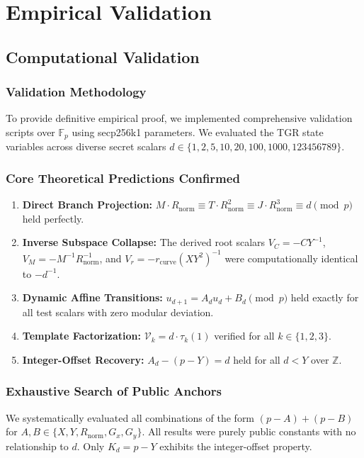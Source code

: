 \documentclass[11pt, a4paper, twoside]{book}
\begin{document}
\part{Empirical Validation}

\chapter{Computational Validation}

\section{Validation Methodology}
To provide definitive empirical proof, we implemented comprehensive validation scripts over $\mathbb{F}_p$ using secp256k1 parameters. We evaluated the TGR state variables across diverse secret scalars $d \in \{1, 2, 5, 10, 20, 100, 1000, 123456789\}$.

\section{Core Theoretical Predictions Confirmed}
\begin{enumerate}
    \item \textbf{Direct Branch Projection:} $M \cdot R_{\text{norm}} \equiv T \cdot R_{\text{norm}}^2 \equiv J \cdot R_{\text{norm}}^3 \equiv d \pmod p$ held perfectly.
    \item \textbf{Inverse Subspace Collapse:} The derived root scalars $V_C = -C Y^{-1}$, $V_M = -M^{-1} R_{\text{norm}}^{-1}$, and $V_r = -r_{\text{curve}} (XY^2)^{-1}$ were computationally identical to $-d^{-1}$.
    \item \textbf{Dynamic Affine Transitions:} $u_{d+1} = A_d u_d + B_d \pmod p$ held exactly for all test scalars with zero modular deviation.
    \item \textbf{Template Factorization:} $\mathcal{V}_k = d \cdot \tau_k(1)$ verified for all $k \in \{1, 2, 3\}$.
    \item \textbf{Integer-Offset Recovery:} $A_d - (p - Y) = d$ held for all $d < Y$ over $\mathbb{Z}$.
\end{enumerate}

\section{Exhaustive Search of Public Anchors}
We systematically evaluated all combinations of the form $(p - A) + (p - B)$ for $A, B \in \{X, Y, R_{\text{norm}}, G_x, G_y\}$. All results were purely public constants with no relationship to $d$. Only $K_d = p - Y$ exhibits the integer-offset property.
\end{document}
